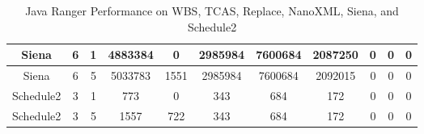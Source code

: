 \begin{table*}[]
\begin{tabular}{@{}ccccccccccc@{}}
        Siena                                                    & 6                                                          & 1    & 4883384                                                     & 0                                                                         & 2985984                                                 & 7600684                                                    & 2087250                                                        & 0                                                         & 0                                                         & 0       \\ \midrule
        Siena                                                    & 6                                                          & 5    & 5033783                                                     & 1551                                                                      & 2985984                                                 & 7600684                                                    & 2092015                                                        & 0                                                         & 0                                                         & 0       \\ \midrule
        Schedule2                                                & 3                                                          & 1    & 773                                                         & 0                                                                         & 343                                                     & 684                                                        & 172                                                            & 0                                                         & 0                                                         & 0       \\ \midrule
        Schedule2                                                & 3                                                          & 5    & 1557                                                        & 722                                                                       & 343                                                     & 684                                                        & 172                                                            & 0                                                         & 0                                                         & 0       \\ \bottomrule
    \end{tabular}
    \caption{Java Ranger Performance on WBS, TCAS, Replace, NanoXML, Siena, and Schedule2}
    \label{table:results1}
\end{table*}


